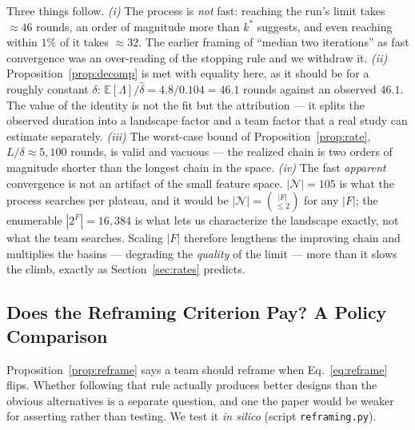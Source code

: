 \documentclass[11pt]{article}
\newcommand{\E}{\mathbb{E}}
\begin{document}
\noindent Three things follow. \emph{(i)} The process is \emph{not} fast: reaching the run's limit takes $\approx46$ rounds, an order of magnitude more than $k^*$ suggests, and even reaching within $1\%$ of it takes $\approx32$. The earlier framing of ``median two iterations'' as fast convergence was an over-reading of the stopping rule and we withdraw it. \emph{(ii)} Proposition~\ref{prop:decomp} is met with equality here, as it should be for a roughly constant $\delta$: $\E[\Lambda]/\hat\delta=4.8/0.104=46.1$ rounds against an observed $46.1$. The value of the identity is not the fit but the attribution --- it splits the observed duration into a landscape factor and a team factor that a real study can estimate separately. \emph{(iii)} The worst-case bound of Proposition~\ref{prop:rate}, $L/\delta\approx5{,}100$ rounds, is valid and vacuous --- the realized chain is two orders of magnitude shorter than the longest chain in the space. \emph{(iv)} The fast \emph{apparent} convergence is not an artifact of the small feature space. $|\mathcal N|=105$ is what the process searches per plateau, and it would be $|\mathcal N|=\binom{|F|}{\le2}$ for any $|F|$; the enumerable $|2^F|=16{,}384$ is what lets us characterize the landscape exactly, not what the team searches. Scaling $|F|$ therefore lengthens the improving chain and multiplies the basins --- degrading the \emph{quality} of the limit --- more than it slows the climb, exactly as Section~\ref{sec:rates} predicts.

\subsection{Does the Reframing Criterion Pay? A Policy Comparison}
\label{sec:reframe-sim}

Proposition~\ref{prop:reframe} says a team should reframe when Eq.~\eqref{eq:reframe} flips. Whether following that rule actually produces better designs than the obvious alternatives is a separate question, and one the paper would be weaker for asserting rather than testing. We test it \emph{in silico} (script \texttt{reframing.py}).
\end{document}
